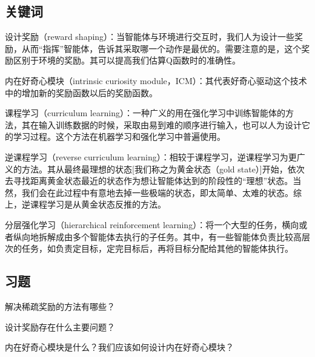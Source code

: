 \subsection{关键词}

设计奖励（reward shaping）：当智能体与环境进行交互时，我们人为设计一些奖励，从而“指挥”智能体，告诉其采取哪一个动作是最优的。需要注意的是，这个奖励区别于环境的奖励。其可以提高我们估算Q函数时的准确性。

内在好奇心模块（intrinsic curiosity module，ICM）：其代表好奇心驱动这个技术中的增加新的奖励函数以后的奖励函数。

课程学习（curriculum learning）：一种广义的用在强化学习中训练智能体的方法，其在输入训练数据的时候，采取由易到难的顺序进行输入，也可以人为设计它的学习过程。这个方法在机器学习和强化学习中普遍使用。

逆课程学习（reverse curriculum learning）：相较于课程学习，逆课程学习为更广义的方法。其从最终最理想的状态[我们称之为黄金状态（gold state）]开始，依次去寻找距离黄金状态最近的状态作为想让智能体达到的阶段性的“理想”状态。当然，我们会在此过程中有意地去掉一些极端的状态，即太简单、太难的状态。综上，逆课程学习是从黄金状态反推的方法。

分层强化学习（hierarchical reinforcement learning）：将一个大型的任务，横向或者纵向地拆解成由多个智能体去执行的子任务。其中，有一些智能体负责比较高层次的任务，如负责定目标，定完目标后，再将目标分配给其他的智能体执行。


\subsection{习题}

 解决稀疏奖励的方法有哪些？

 设计奖励存在什么主要问题？

 内在好奇心模块是什么？我们应该如何设计内在好奇心模块？
